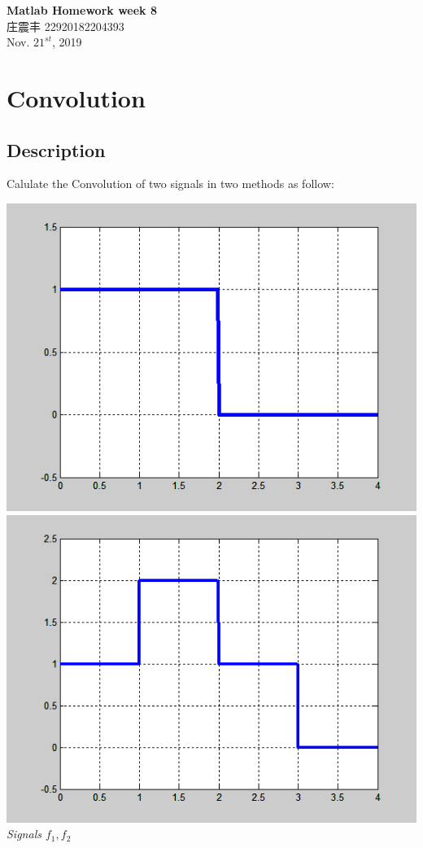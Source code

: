 \documentclass[UTF8,a4paper]{article}
\begin{document}
\begin{center}
    \textbf{\LARGE{Matlab Homework week 8}}\\[0.5cm]
    \normalsize{庄震丰 22920182204393}\\[0.5cm]
    \large{Nov. $21^{st}$, 2019}
\end{center}
\section{Convolution}
\subsection{Description}
Calulate the Convolution of two signals in two methods as follow:
\begin{center}
    \includegraphics[scale=0.4]{T-1.png}
    \includegraphics[scale=0.4]{T-1-2.png}\\	
	\textit{Signals $f_1,f_2$}
\end{center}
\end{document}
